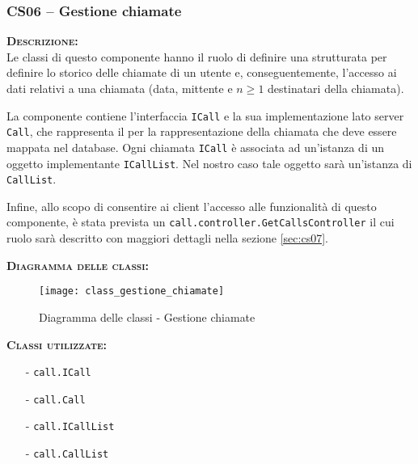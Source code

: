 
\subsubsection{CS06 -- Gestione chiamate}\label{sec:cs06}
\begin{description}
  \item{\scshape\bfseries Descrizione:}\\
Le classi di questo componente hanno il ruolo di definire una strutturata per definire lo storico delle chiamate di un utente e, conseguentemente, l'accesso ai dati relativi a una chiamata (data, mittente e $n\geq1$ destinatari della chiamata).

La componente contiene l'interfaccia \texttt{ICall} e la sua implementazione lato server \texttt{Call}, che rappresenta il  per la rappresentazione della chiamata che deve essere mappata nel database. Ogni chiamata \texttt{ICall} è associata ad un'istanza di un oggetto implementante \texttt{ICallList}. Nel nostro caso tale oggetto sarà un'istanza di \texttt{CallList}.

Infine, allo scopo di consentire ai client l'accesso alle funzionalità di questo componente, è stata prevista un  \texttt{call.controller.GetCallsController} il cui ruolo sarà descritto con maggiori dettagli nella sezione \vref{sec:cs07}.

  \item{\scshape\bfseries Diagramma delle classi:}
\begin{figure}[H]
  \centering
  \texttt{[image: class\_gestione\_chiamate]}
  \caption{Diagramma delle classi - Gestione chiamate}\label{fig:gestionechiamate}
\end{figure}

  \item{\scshape\bfseries Classi utilizzate:}\\
  \begin{itemize}[noitemsep,nolistsep]
    \item[-] \texttt{call.ICall}
    \item[-] \texttt{call.Call}
    \item[-] \texttt{call.ICallList}
    \item[-] \texttt{call.CallList}
  \end{itemize}
\end{description}

